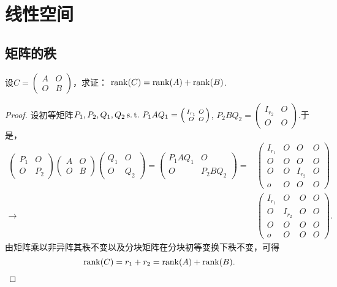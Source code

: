 \section{线性空间}

\subsection{矩阵的秩}

\begin{example}
  设\(C=\left(\begin{smallmatrix}
      A & O \\
      O & B \end{smallmatrix}\right)\)，求证：
  \(\operatorname{rank}(C)=\operatorname{rank}(A)+\operatorname{rank}(B)\).
\end{example}

\begin{proof}
  设初等矩阵\(P_1,P_2,Q_1,Q_2 \operatorname{s.t.{}} P_1AQ_1=\left(\begin{smallmatrix}
      I_{r_1} & O \\
      O & O \end{smallmatrix}\right)\),
  \(P_2BQ_2=\left(\begin{smallmatrix}
      I_{r_{2}} & O \\
      O & O \end{smallmatrix}\right)\).于是，
  \begin{align*}\begin{pmatrix}
      P_1 & O \\
      O & P_2 \end{pmatrix} \begin{pmatrix}
      A & O \\
      O & B \end{pmatrix} \begin{pmatrix}
      Q_1 & O \\
      O & Q_2 \end{pmatrix} = \begin{pmatrix}
      P_1AQ_1 & O \\
      O & P_2BQ_2 \end{pmatrix}  = & \begin{pmatrix}
      I_{r_1} & O & O & O \\
      O & O & O & O \\
      O & O & I_{r_2} & O \\
      o & O & O & O\end{pmatrix} \\
      \longrightarrow & \begin{pmatrix}
      I_{r_1} & O & O & O \\
      O & I_{r_2} & O & O \\
      O & O & O & O \\
      o & O & O & O\end{pmatrix}.\end{align*}
  由矩阵乘以非异阵其秩不变以及分块矩阵在分块初等变换下秩不变，可得
  \[\operatorname{rank}(C)=r_1+r_2=\operatorname{rank}(A)+\operatorname{rank}(B).\]
\end{proof}

